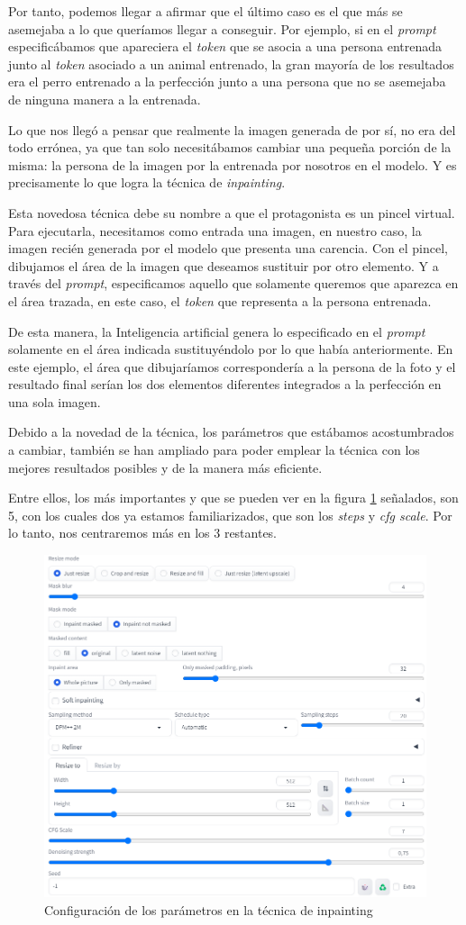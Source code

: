 Por tanto, podemos llegar a afirmar que el último caso es el que más se asemejaba a lo que queríamos llegar a conseguir. Por ejemplo, si en el \textit{prompt} especificábamos que apareciera el \textit{token} que se asocia a una persona entrenada junto al \textit{token} asociado a un animal entrenado, la gran mayoría de los resultados era el perro entrenado a la perfección junto a una persona que no se asemejaba de ninguna manera a la entrenada.  

Lo que nos llegó a pensar que realmente la imagen generada de por sí, no era del todo errónea, ya que tan solo necesitábamos cambiar una pequeña porción de la misma: la persona de la imagen por la entrenada por nosotros en el modelo. Y es precisamente lo que logra la técnica de \textit{inpainting}. 

Esta novedosa técnica debe su nombre a que el protagonista es un pincel virtual. Para ejecutarla, necesitamos como entrada una imagen, en nuestro caso, la imagen recién generada por el modelo que presenta una carencia. Con el pincel, dibujamos el área de la imagen que deseamos sustituir por otro elemento. Y a través del \textit{prompt}, especificamos aquello que solamente queremos que aparezca en el área trazada, en este caso, el \textit{token} que representa a la persona entrenada. 

De esta manera, la Inteligencia artificial genera lo especificado en el \textit{prompt} solamente en el área indicada sustituyéndolo por lo que había anteriormente. En este ejemplo, el área que dibujaríamos correspondería a la persona de la foto y el resultado final serían los dos elementos diferentes integrados a la perfección en una sola imagen. 

Debido a la novedad de la técnica, los parámetros que estábamos acostumbrados a cambiar, también se han ampliado para poder emplear la técnica con los mejores resultados posibles y de la manera más eficiente. 

Entre ellos, los más importantes y que se pueden ver en la figura \ref{fig:paramsinpainting} señalados, son 5, con los cuales dos ya estamos familiarizados, que son los \textit{steps} y \textit{cfg scale}. Por lo tanto, nos centraremos más en los 3 restantes. 

\begin{figure}[h]
	\centering
	\includegraphics[width = 0.6
	\textwidth]{Imagenes/Vectorial/parametrosinpainting.png}
	\caption{Configuración de los parámetros en la técnica de inpainting}
	\label{fig:paramsinpainting}
\end{figure}

